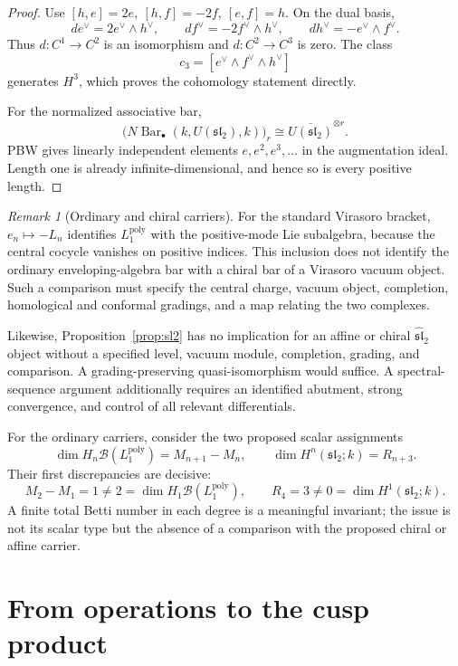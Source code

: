 \documentclass[11pt,reqno]{amsart}
\theoremstyle{definition}
\theoremstyle{remark}
\newtheorem{remark}[theorem]{Remark}
\newcommand{\Barc}{\operatorname{Bar}}
\begin{document}
\begin{proof}
Use
\([h,e]=2e,\ [h,f]=-2f,\ [e,f]=h\).  On the dual basis,
\[
 de^\vee=2e^\vee\wedge h^\vee,\qquad
 df^\vee=-2f^\vee\wedge h^\vee,\qquad
 dh^\vee=-e^\vee\wedge f^\vee.
\]
Thus \(d:C^1\to C^2\) is an isomorphism and
\(d:C^2\to C^3\) is zero.  The class
\[
 c_3=[e^\vee\wedge f^\vee\wedge h^\vee]
\]
generates \(H^3\), which proves the cohomology statement directly.

For the normalized associative bar,
\[
 \bigl(N\Barc_\bullet(k,U(\mathfrak{sl}_2),k)\bigr)_r
 \cong\overline{U(\mathfrak{sl}_2)}^{\otimes r}.
\]
PBW gives linearly independent elements
\(e,e^2,e^3,\ldots\) in the augmentation ideal.  Length one is already
infinite-dimensional, and hence so is every positive length.
\end{proof}

\begin{remark}[Ordinary and chiral carriers]
\label{rem:family-carriers}
For the standard Virasoro bracket,
\(e_n\mapsto-L_n\) identifies \(L_1^{\mathrm{poly}}\) with the
positive-mode Lie subalgebra, because the central cocycle vanishes on
positive indices.  This inclusion does not identify the ordinary
enveloping-algebra bar with a chiral bar of a Virasoro vacuum object.
Such a comparison must specify the central charge, vacuum object,
completion, homological and conformal gradings, and a map relating the
two complexes.

Likewise, Proposition~\ref{prop:sl2} has no implication for an affine
or chiral \(\widehat{\mathfrak{sl}}_2\) object without a specified
level, vacuum module, completion, grading, and comparison.  A
grading-preserving quasi-isomorphism would suffice.  A spectral-sequence
argument additionally requires an identified abutment, strong
convergence, and control of all relevant differentials.
\end{remark}

For the ordinary carriers, consider the two proposed scalar assignments
\[
 \dim H_n\mathcal B(L_1^{\mathrm{poly}})=M_{n+1}-M_n,
 \qquad
 \dim H^n(\mathfrak{sl}_2;k)=R_{n+3}.
\]
Their first discrepancies are decisive:
\[
 M_2-M_1=1\ne2=\dim H_1\mathcal B(L_1^{\mathrm{poly}}),
\qquad
 R_4=3\ne0=\dim H^1(\mathfrak{sl}_2;k).
\]
A finite total Betti number in each degree is a meaningful invariant;
the issue is not its scalar type but the absence of a comparison with
the proposed chiral or affine carrier.



\section{From operations to the cusp product}
\end{document}
